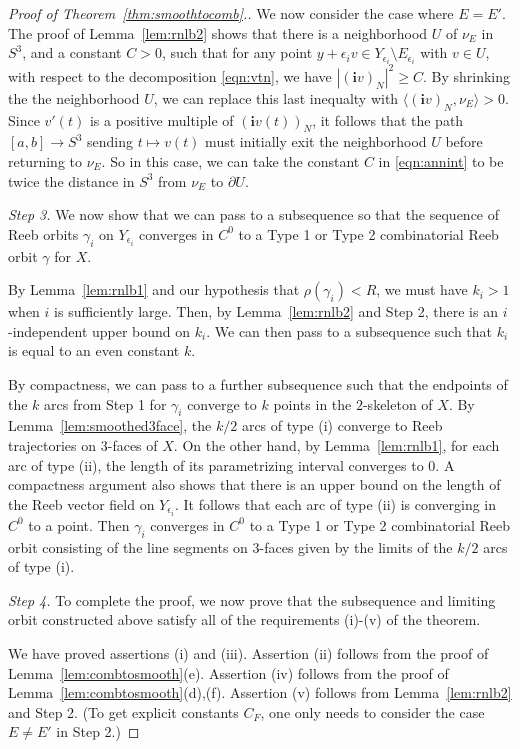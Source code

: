 \begin{proof}[Proof of Theorem~\ref{thm:smoothtocomb}.]
We now consider the case where $E=E'$. The proof of Lemma~\ref{lem:rnlb2} shows that there is a neighborhood $U$ of $\nu_E$ in $S^3$, and a constant $C>0$, such that for any point $y+\epsilon_i v\in Y_{\epsilon_i}\setminus E_{\epsilon_i}$ with $v\in U$, with respect to the decomposition \eqref{eqn:vtn}, we have $|({\mathbf i}v)_N|^2\ge C$. By shrinking the the neighborhood $U$, we can replace this last inequalty with $\langle ({\mathbf i}v)_N,\nu_E\rangle > 0$. Since $v'(t)$ is a positive multiple of $({\mathbf i}v(t))_N$, it follows that the path $[a,b]\to S^3$ sending $t\mapsto v(t)$ must initially exit the neighborhood $U$ before returning to $\nu_E$. So in this case, we can take the constant $C$ in \eqref{eqn:annint} to be twice the distance in $S^3$ from $\nu_E$ to $\partial U$.

{\em Step 3.\/} We now show that we can pass to a subsequence so that the sequence of Reeb orbits $\gamma_i$ on $Y_{\epsilon_i}$ converges in $C^0$ to a Type 1 or Type 2 combinatorial Reeb orbit $\gamma$ for $X$.

By Lemma~\ref{lem:rnlb1} and our hypothesis that $\rho(\gamma_i)<R$, we must have $k_i>1$ when $i$ is sufficiently large. Then, by Lemma~\ref{lem:rnlb2} and Step 2, there is an $i$-independent upper bound on $k_i$. We can then pass to a subsequence such that $k_i$ is equal to an even constant $k$.

By compactness, we can pass to a further subsequence such that the endpoints of the $k$ arcs from Step 1 for $\gamma_i$ converge to $k$ points in the $2$-skeleton of $X$. By Lemma~\ref{lem:smoothed3face}, the $k/2$ arcs of type (i) converge to Reeb trajectories on $3$-faces of $X$. On the other hand, by Lemma~\ref{lem:rnlb1}, for each arc of type (ii), the length of its parametrizing interval converges to $0$. A compactness argument also shows that there is an upper bound on the length of the Reeb vector field on $Y_{\epsilon_i}$. It follows that each arc of type (ii) is converging in $C^0$ to a point. Then $\gamma_i$ converges in $C^0$ to a Type 1 or Type 2 combinatorial Reeb orbit consisting of the line segments on $3$-faces given by the limits of the $k/2$ arcs of type (i).

{\em Step 4.\/} To complete the proof, we now prove that the subsequence and limiting orbit constructed above satisfy all of the requirements (i)-(v) of the theorem.

We have proved assertions (i) and (iii). Assertion (ii) follows from the proof of Lemma~\ref{lem:combtosmooth}(e). Assertion (iv) follows from the proof of Lemma~\ref{lem:combtosmooth}(d),(f). Assertion (v) follows from Lemma~\ref{lem:rnlb2} and Step 2. (To get explicit constants $C_F$, one only needs to consider the case $E\neq E'$ in Step 2.)
\end{proof}







